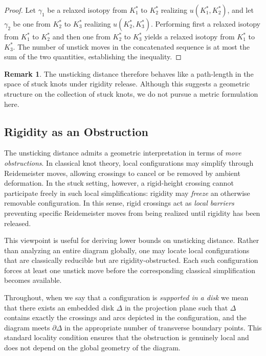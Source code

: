 \documentclass[11pt,a4paper]{article}
\theoremstyle{plain}
\theoremstyle{definition}
\newtheorem{remark}[theorem]{Remark}
\begin{document}
\begin{proof}
Let $\gamma_1$ be a relaxed isotopy from $K_1^*$ to $K_2^*$ realizing $u(K_1^*,K_2^*)$, and let $\gamma_2$ be one from $K_2^*$ to $K_3^*$ realizing $u(K_2^*,K_3^*)$. Performing first a relaxed isotopy from $K_1^*$ to $K_2^*$ and then one from $K_2^*$ to $K_3^*$ yields a relaxed isotopy from $K_1^*$ to $K_3^*$. The number of unstick moves in the concatenated sequence is at most the sum of the two quantities, establishing the inequality.
\end{proof}


\begin{remark}
The unsticking distance therefore behaves like a path-length in the space of stuck knots under rigidity release. Although this suggests a geometric structure on the collection of stuck knots, we do not pursue a metric formulation here.
\end{remark}



\subsection{Rigidity as an Obstruction}\label{subsec:obstruction}

The unsticking distance admits a geometric interpretation in terms of \emph{move obstructions}. In classical knot theory, local configurations may simplify through Reidemeister moves, allowing crossings to cancel or be removed by ambient deformation. In the stuck setting, however, a
rigid-height crossing cannot participate freely in such local simplifications: rigidity may \emph{freeze} an otherwise removable configuration. In this sense, rigid crossings act as \emph{local barriers}
preventing specific Reidemeister moves from being realized until rigidity has been released.

This viewpoint is useful for deriving lower bounds on unsticking distance. Rather than analyzing an entire diagram globally, one may locate local configurations that are classically reducible but are
rigidity-obstructed. Each such configuration forces at least one unstick move before the corresponding classical simplification becomes available.

\medskip

Throughout, when we say that a configuration is \emph{supported in a disk} we mean that there exists an
embedded disk $\Delta$ in the projection plane such that $\Delta$ contains exactly the crossings and arcs
depicted in the configuration, and the diagram meets $\partial\Delta$ in the appropriate number of
transverse boundary points. This standard locality condition ensures that the obstruction is genuinely
local and does not depend on the global geometry of the diagram.
\end{document}
